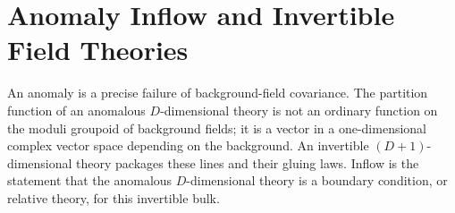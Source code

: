 \chapter{Anomaly Inflow and Invertible Field Theories}
\label{ch:global-anomaly-inflow-invertible-field-theories}

\ConventionsMixed

An anomaly is a precise failure of background-field covariance.  The
partition function of an anomalous \(D\)-dimensional theory is not an
ordinary function on the moduli groupoid of background fields; it is a vector
in a one-dimensional complex vector space depending on the background.  An
invertible \((D+1)\)-dimensional theory packages these lines and their
gluing laws.  Inflow is the statement that the anomalous \(D\)-dimensional
theory is a boundary condition, or relative theory, for this invertible bulk.

